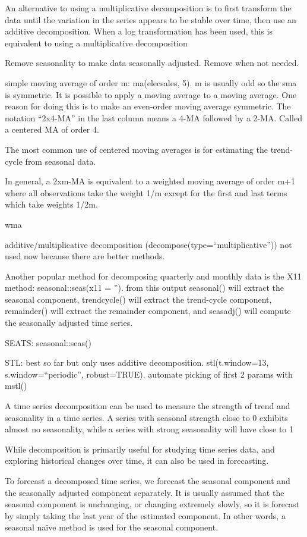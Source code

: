 \documentclass[]{book}
\begin{document}
An alternative to using a multiplicative decomposition is to first
transform the data until the variation in the series appears to be
stable over time, then use an additive decomposition. When a log
transformation has been used, this is equivalent to using a
multiplicative decomposition

Remove seasonality to make data seasonally adjusted. Remove when not
needed.

simple moving average of order m: ma(elecsales, 5). m is usually odd so
the sma is symmetric. It is possible to apply a moving average to a
moving average. One reason for doing this is to make an even-order
moving average symmetric. The notation ``2x4-MA'' in the last column
means a 4-MA followed by a 2-MA. Called a centered MA of order 4.

The most common use of centered moving averages is for estimating the
trend-cycle from seasonal data.

In general, a 2xm-MA is equivalent to a weighted moving average of order
m+1 where all observations take the weight 1/m except for the first and
last terms which take weights 1/2m.

wma

additive/multiplicative decomposition
(decompose(type=``multiplicative'')) not used now because there are
better methods.

Another popular method for decomposing quarterly and monthly data is the
X11 method: seasonal::seas(x11 = ''). from this output seasonal() will
extract the seasonal component, trendcycle() will extract the
trend-cycle component, remainder() will extract the remainder component,
and seasadj() will compute the seasonally adjusted time series.

SEATS: seasonal::seas()

STL: best so far but only uses additive decomposition. stl(t.window=13,
s.window=``periodic'', robust=TRUE). automate picking of first 2 params
with mstl()

A time series decomposition can be used to measure the strength of trend
and seasonality in a time series. A series with seasonal strength close
to 0 exhibits almost no seasonality, while a series with strong
seasonality will have close to 1

While decomposition is primarily useful for studying time series data,
and exploring historical changes over time, it can also be used in
forecasting.

To forecast a decomposed time series, we forecast the seasonal component
and the seasonally adjusted component separately. It is usually assumed
that the seasonal component is unchanging, or changing extremely slowly,
so it is forecast by simply taking the last year of the estimated
component. In other words, a seasonal naïve method is used for the
seasonal component.
\end{document}
